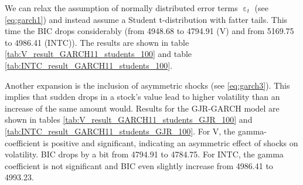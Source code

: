 \begin{table}[h]
    \centering
    
    \caption{}
    \label{tab:V_result_GARCH11_100}
\end{table}{}

\begin{table}[h!]
    \centering
    
    \caption{}
    \label{tab:INTC_result_GARCH11_100}
\end{table}{}

We can relax the assumption of normally distributed error terms $\upepsilon_t$ (see \ref{eq:garch1}) and instead assume a Student t-distribution with fatter tails. This time the BIC drops considerably (from 4948.68 to 4794.91 (V) and from 5169.75 to 4986.41 (INTC)). The results are shown in table \ref{tab:V_result_GARCH11_students_100} and table \ref{tab:INTC_result_GARCH11_students_100}. 

\begin{table}[h]
    \centering
    
    \caption{}
    \label{tab:V_result_GARCH11_students_100}
\end{table}{}

\begin{table}[h!]
    \centering
    
    \caption{}
    \label{tab:INTC_result_GARCH11_students_100}
\end{table}{}

Another expansion is the inclusion of asymmetric shocks (see \ref{eq:garch3}). This implies that sudden drops in a stock's value lead to higher volatility than an increase of the same amount would. Results for the GJR-GARCH model are shown in tables \ref{tab:V_result_GARCH11_students_GJR_100} and \ref{tab:INTC_result_GARCH11_students_GJR_100}. For V, the gamma-coefficient is positive and significant, indicating an asymmetric effect of shocks on volatility. BIC drops by a bit from 4794.91 to 4784.75. For INTC, the gamma coefficient is not significant and BIC even slightly increase from 4986.41 to 4993.23.

\begin{table}[h]
    \centering
    
    \caption{}
    \label{tab:V_result_GARCH11_students_GJR_100}
\end{table}{}

